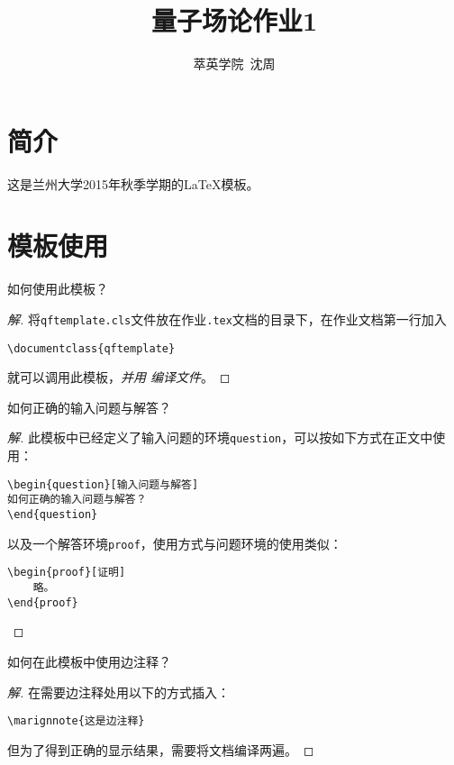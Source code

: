 \documentclass{qftemplate}
\author{萃英学院\ 沈周}
\title{量子场论作业1}
\begin{document}
\maketitle
\section{简介}
这是兰州大学2015年秋季学期的\LaTeX 模板。
\section{模板使用}
\begin{question}
如何使用此模板？
\end{question}
\begin{proof}[解]
    将{\tt qftemplate.cls}文件放在作业{\tt .tex}文档的目录下，在作业文档第一行加入
    \begin{verbatim}
\documentclass{qftemplate}
    \end{verbatim}
    就可以调用此模板，{\it 并用 \XeLaTeX 编译文件}。
\end{proof}

\begin{question}[输入问题与解答]
    如何正确的输入问题与解答？
\end{question}
\begin{proof}[解]
    此模板中已经定义了输入问题的环境{\tt question}，可以按如下方式在正文中使用：
\begin{verbatim}
\begin{question}[输入问题与解答]
如何正确的输入问题与解答？
\end{question}
\end{verbatim}
以及一个解答环境{\tt proof}，使用方式与问题环境的使用类似：
\begin{verbatim}
\begin{proof}[证明]
    略。
\end{proof}
\end{verbatim}
\end{proof}

\begin{question}[边注释]
    如何在此模板中使用边注释？
\end{question}
\begin{proof}[解]
    在需要边注释处用以下的方式插入：
\begin{verbatim}
\marignnote{这是边注释}
\end{verbatim}
但为了得到正确的显示结果，需要将文档编译两遍。
\end{proof}
\end{document}
